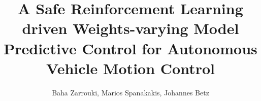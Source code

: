 %
% 



\setcounter{section}{0}
\title{A Safe Reinforcement Learning driven Weights-varying Model Predictive Control for Autonomous Vehicle Motion Control}


\author{Baha Zarrouki, Marios Spanakakis, Johannes Betz}

%


%

\maketitle


